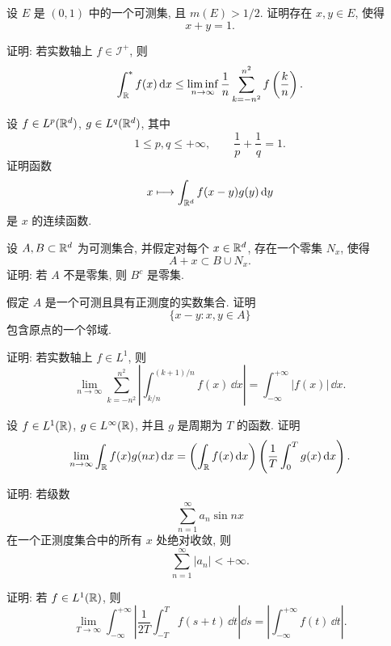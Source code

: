 \begin{exer}
	设 \(E\) 是 \((0,1)\) 中的一个可测集, 且 \(m(E)>1/2\). 证明存在 \(x,y\in E\), 使得
	\[
	x+y=1.
	\]
\end{exer}

\begin{exer}
	证明: 若实数轴上 \(f\in\mathcal I^+\), 则
	\[
	\int_{\mathbb{R}}^{*} f(x)\,\dd x
	\leq
	\liminf_{n\to\infty}\frac1n\sum_{k=-n^2}^{n^2}f\left(\frac{k}{n}\right).
	\]
\end{exer}

\begin{exer}
	设 \(f\in L^p(\mathbb{R}^d)\), \(g\in L^q(\mathbb{R}^d)\), 其中
	\[
	1\leq p,q\leq +\infty,
	\qquad
	\frac1p+\frac1q=1.
	\]
	证明函数
	\[
	x\longmapsto \int_{\mathbb{R}^d} f(x-y)g(y)\,\dd y
	\]
	是 \(x\) 的连续函数.
\end{exer}

\begin{exer}
	设 \(A,B\subset\mathbb{R}^d\) 为可测集合, 并假定对每个 \(x\in\mathbb{R}^d\), 存在一个零集 \(N_x\), 使得
	\[
	A+x\subset B\cup N_x.
	\]
	证明: 若 \(A\) 不是零集, 则 \(B^c\) 是零集.
\end{exer}

\begin{exer}
	假定 \(A\) 是一个可测且具有正测度的实数集合. 证明
	\[
	\{x-y:x,y\in A\}
	\]
	包含原点的一个邻域.
\end{exer}

\begin{exer}
	证明: 若实数轴上 \(f\in L^1\), 则
	\[
	\lim_{n\to\infty}
	\sum_{k=-n^2}^{n^2}
	\left|
	\int_{k/n}^{(k+1)/n}f(x)\,\dd x
	\right|
	=
	\int_{-\infty}^{+\infty}|f(x)|\,\dd x.
	\]
\end{exer}

\begin{exer}
	设 \(f\in L^1(\mathbb{R})\), \(g\in L^\infty(\mathbb{R})\), 并且 \(g\) 是周期为 \(T\) 的函数. 证明
	\[
	\lim_{n\to\infty}\int_{\mathbb{R}} f(x)g(nx)\,\dd x
	=
	\left(\int_{\mathbb{R}}f(x)\,\dd x\right)
	\left(\frac1T\int_0^T g(x)\,\dd x\right).
	\]
\end{exer}

\begin{exer}
	证明: 若级数
	\[
	\sum_{n=1}^{\infty}a_n\sin nx
	\]
	在一个正测度集合中的所有 \(x\) 处绝对收敛, 则
	\[
	\sum_{n=1}^{\infty}|a_n|<+\infty.
	\]
\end{exer}

\begin{exer}
	证明: 若 \(f\in L^1(\mathbb{R})\), 则
	\[
	\lim_{T\to\infty}
	\int_{-\infty}^{+\infty}
	\left|
	\frac1{2T}\int_{-T}^{T} f(s+t)\,\dd t
	\right|\dd s
	=
	\left|\int_{-\infty}^{+\infty}f(t)\,\dd t\right|.
	\]
\end{exer}

